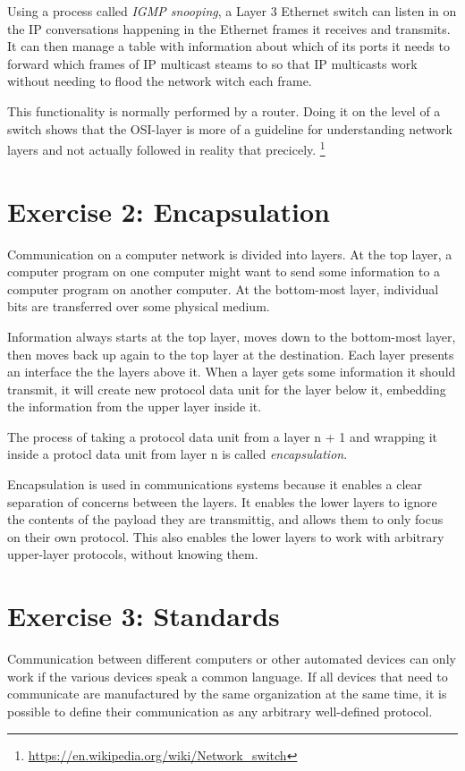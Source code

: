 \documentclass[a4paper]{article}
\begin{document}
Using a process called \textit{IGMP snooping}, a Layer 3 Ethernet switch can listen in on the IP conversations happening in the Ethernet frames it receives and transmits. It can then manage a table with information about which of its ports it needs to forward which frames of IP multicast steams to so that IP multicasts work without needing to flood the network witch each frame.

This functionality is normally performed by a router. Doing it on the level of a switch shows that the OSI-layer is more of a guideline for understanding network layers and not actually followed in reality that precicely.  
\footnote{\url{https://en.wikipedia.org/wiki/Network_switch}}

\section{Exercise 2: Encapsulation}

Communication on a computer network is divided into layers. At the top layer, a computer program on one computer might want to send some information to a computer program on another computer. At the bottom-most layer, individual bits are transferred over some physical medium. 

Information always starts at the top layer, moves down to the bottom-most layer, then moves back up again to the top layer at the destination. Each layer presents an interface the the layers above it. When a layer gets some information it should transmit, it will create new protocol data unit for the layer below it, embedding the information from the upper layer inside it.

The process of taking a protocol data unit from a layer n + 1 and wrapping it inside a protocl data unit from layer n is called \textit{encapsulation}.

Encapsulation is used in communications systems because it enables a clear separation of concerns between the layers. It enables the lower layers to ignore the contents of the payload they are transmittig, and allows them to only focus on their own protocol. This also enables the lower layers to work with arbitrary upper-layer protocols, without knowing them.

\section{Exercise 3: Standards}

Communication between different computers or other automated devices can only work if the various devices speak a common language. If all devices that need to communicate are manufactured by the same organization at the same time, it is possible to define their communication as any arbitrary well-defined protocol.
\end{document}
